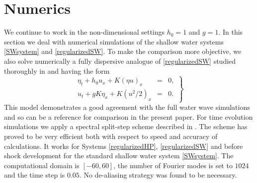 \documentclass[reqno,12pt,a4paper]{article}
\theoremstyle{plain}
\begin{document}
\section{Numerics}
\setcounter{equation}{0}
%
\noindent
%
%
We continue to work in the non-dimensional settings
$h_0 = 1$ and $g = 1$.
In this section we deal with numerical simulations
of the shallow water systems \eqref{SWsystem} and
\eqref{regularizedSW}.
To make the comparison more objective,
we also solve numerically
a fully dispersive analogue of \eqref{regularizedSW}
studied thoroughly in \cite{Dinvay, Dinvay_Dutykh_Kalisch}
and having the form
%
\begin{equation}
\label{regularizedHP}
	\left.
	\begin{array}{rcl}
		\eta_t + h_0 u_x  + K ( \eta u )_x
		& = &
		0
		, \\
		u_t + g K \eta_x + K ( u^2/2 )_x
		& = &
		0
		.
	\end{array}
	\right\}
\end{equation}
%
This model demonstrates a good agreement with the
full water wave simulations and so can be a reference for comparison
in the present paper.
For time evolution simulations we apply a spectral split-step scheme
described in \cite{Dinvay_Dutykh_Kalisch}.
The scheme has proved to be very efficient both
with respect to speed and accuracy of calculations.
It works for Systems \eqref{regularizedHP},
\eqref{regularizedSW} and before shock development
for the standard shallow water system \eqref{SWsystem}.
The computational domain is $[- 60, 60]$,
the number of Fourier modes is set to $1024$ and
the time step is $0.05$.
No de-aliasing strategy was found to be necessary.
\end{document}
